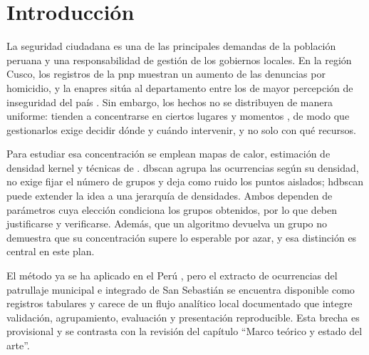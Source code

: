 \chapter*{Introducción}

La seguridad ciudadana es una de las principales demandas de la población peruana y una responsabilidad de gestión de los gobiernos locales. En la región Cusco, los registros de la \gls{pnp} muestran un aumento de las denuncias por homicidio, y la \gls{enapres} sitúa al departamento entre los de mayor percepción de inseguridad del país \citep{inei2023enapres}. Sin embargo, los hechos no se distribuyen de manera uniforme: tienden a concentrarse en ciertos lugares y momentos \citep{ristea2020crimegis,medinaariza2023hotspots}, de modo que gestionarlos exige decidir dónde y cuándo intervenir, y no solo con qué recursos.

Para estudiar esa concentración se emplean mapas de calor, estimación de densidad kernel y técnicas de  \citep{ristea2020crimegis,hajela2020hotspot}. \gls{dbscan} \citep{choi2021mdstdbscan,xie2021significantdbscan} agrupa las ocurrencias según su densidad, no exige fijar el número de grupos y deja como ruido los puntos aislados; \gls{hdbscan} puede extender la idea a una jerarquía de densidades. Ambos dependen de parámetros cuya elección condiciona los grupos obtenidos, por lo que deben justificarse y verificarse. Además, que un algoritmo devuelva un grupo no demuestra que su concentración supere lo esperable por azar, y esa distinción es central en este plan.

El método ya se ha aplicado en el Perú \citep{cutid2025}, pero el extracto de ocurrencias del patrullaje municipal e integrado de San Sebastián se encuentra disponible como registros tabulares y carece de un flujo analítico local documentado que integre validación, agrupamiento, evaluación y presentación reproducible. Esta brecha es provisional y se contrasta con la revisión del capítulo ``Marco teórico y estado del arte''.

